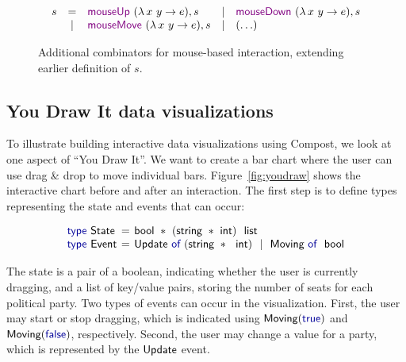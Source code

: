 \documentclass{jfp}
\newcommand{\ident}[1]{\textnormal{\textcolor{idclr}{\sffamily #1}}}
\newcommand{\kvd}[1]{\textnormal{\textcolor{kvdclr}{\sffamily #1}}}
\newcommand{\fkvd}[1]{\textnormal{\textcolor{fkvdclr}{\sffamily #1}}}
\newcommand{\narrow}[1]{\hspace{-0.6em}#1\hspace{-0.6em}}
\begin{document}
\begin{figure}
\begin{equation*}
\begin{array}{rclcl}
s & = & \kvd{mouseUp}~(\lambda \,x~y \rightarrow e), s  &|& \kvd{mouseDown}~(\lambda \,x~y\rightarrow e), s  \\
    &|& \kvd{mouseMove}~(\lambda \,x~y \rightarrow e), s &|& (\ldots)
\end{array}
\end{equation*}
\caption{Additional combinators for mouse-based interaction, extending earlier definition of $s$.}
\vspace{0.5em}
\label{fig:mouse}
\end{figure}

\subsection{You Draw It data visualizations}
To illustrate building interactive data visualizations using Compost, we look at one aspect of
``You Draw It''. We want to create a bar chart where the user can use drag \& drop
to move individual bars. Figure~\ref{fig:youdraw} shows the interactive chart before and after an
interaction. The first step is to define types representing the state and events that can occur:

\noindent
\begin{equation*}
\begin{array}{lll}
\fkvd{type}~\ident{State} &\narrow{=}& \ident{bool}~*~(\ident{string}~*~\ident{int})~\ident{list}\\
\fkvd{type}~\ident{Event} &\narrow{=}& \ident{Update}~\fkvd{of}~(\ident{string}~*~\ident{int}) ~~|~~ \ident{Moving}~\fkvd{of}~\ident{bool}
\end{array}
\end{equation*}

\vspace{-0.5em}
\noindent
The state is a pair of a boolean, indicating whether the user is currently dragging, and
a list of key/value pairs, storing the number of seats for each political party. Two types of events
can occur in the visualization. First, the user may start or stop dragging, which is indicated using
$\ident{Moving}(\fkvd{true})$ and $\ident{Moving}(\fkvd{false})$, respectively. Second, the user
may change a value for a party, which is represented by the $\ident{Update}$ event.
\end{document}
